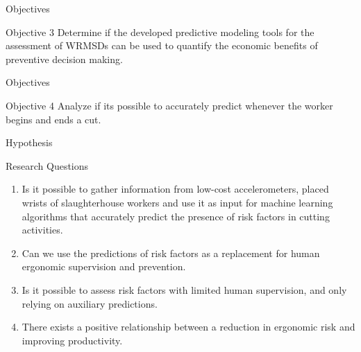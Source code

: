 \begin{frame}{Objectives}
    \begin{alertblock}{Objective 3}
    Determine if the developed predictive modeling tools for the assessment of WRMSDs can be used to quantify the economic benefits of preventive decision making.
    \end{alertblock}
\end{frame}

\begin{frame}{Objectives}
    \begin{alertblock}{Objective 4}
    Analyze if its possible to accurately predict whenever the worker begins and ends a cut.
    \end{alertblock}
\end{frame}



\begin{frame}{Hypothesis}
    \begin{alertblock}{Research Questions}
    \begin{enumerate}%
    \item Is it possible to gather information from low-cost accelerometers, placed wrists of slaughterhouse workers and use it as input for machine learning algorithms that accurately predict the presence of risk factors in cutting activities.
    \item Can we use the predictions of risk factors as a replacement for human ergonomic supervision and prevention.
    \item Is it possible to assess risk factors with limited human supervision, and only relying on auxiliary predictions.
    \item There exists a positive relationship between a reduction in ergonomic risk and improving productivity.
    \end{enumerate}
    \end{alertblock}
\end{frame}


